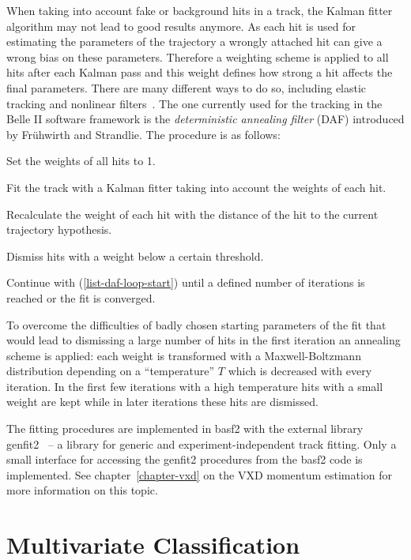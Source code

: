 When taking into account fake or background hits in a track, the Kalman fitter algorithm may not lead to good results anymore. As each hit is used for estimating the parameters of the trajectory a wrongly attached hit can give a wrong bias on these parameters. Therefore a weighting scheme is applied to all hits after each Kalman pass and this weight defines how strong a hit affects the final parameters. There are many different ways to do so, including elastic tracking and nonlinear filters~\cite{daf_fruh}. The one currently used for the tracking in the Belle II software framework is the \emph{deterministic annealing filter} (DAF) introduced by Frühwirth and Strandlie. The procedure is as follows:
\begin{zlist}
  \item Set the weights of all hits to 1.
  \item Fit the track with a Kalman fitter taking into account the weights of each hit. \label{list-daf-loop-start}
  \item Recalculate the weight of each hit with the distance of the hit to the current trajectory hypothesis.
  \item Dismiss hits with a weight below a certain threshold.
  \item Continue with (\ref{list-daf-loop-start}) until a defined number of iterations is reached or the fit is converged.
\end{zlist}

To overcome the difficulties of badly chosen starting parameters of the fit that would lead to dismissing a large number of hits in the first iteration an annealing scheme is applied: each weight is transformed with a Maxwell-Boltzmann distribution depending on a ``temperature'' $T$ which is decreased with every iteration. In the first few iterations with a high temperature hits with a small weight are kept while in later iterations these hits are dismissed.

The fitting procedures are implemented in basf2 with the external library genfit2~\cite{genfit} -- a library for generic and experiment-independent track fitting. Only a small interface for accessing the genfit2 procedures from the basf2 code is implemented. See chapter~\ref{chapter-vxd} on the VXD momentum estimation for more information on this topic.

\section{Multivariate Classification}

